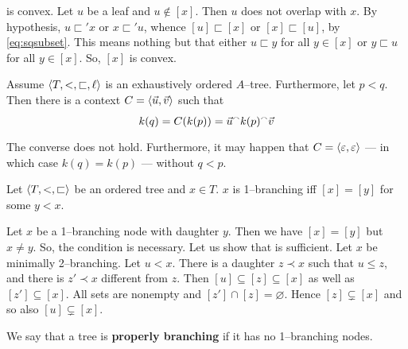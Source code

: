 is convex. Let $u$ be a leaf and $u \not\in [x]$. Then $u$ does not 
overlap with $x$.  By hypothesis, $u \sqsubset' x$ or $x \sqsubset' u$, 
whence $[u] \sqsubset [x]$ or $[x] \sqsubset [u]$, by \eqref{eq:sqsubset}. 
This means nothing but that either $u \sqsubset y$ for all 
$y \in [x]$ or $y \sqsubset u$ for all $y \in [x]$. So, $[x]$ is
convex.
\proofend
\begin{lem}
Assume $\langle T, <, \sqsubset, \ell\rangle$ is an exhaustively
ordered $A$--tree. Furthermore, let $p < q$. Then there is a
context $C = \langle \vec{u}, \vec{v}\rangle$ such that
\begin{equation}
k(q) = C(k(p)) = \vec{u} {^{\smallfrown}} k(p) {^{\smallfrown}} \vec{v} 
\end{equation}
\end{lem}
The converse does not hold. Furthermore, it may happen that
$C = \langle\varepsilon, \varepsilon\rangle$ --- in which case
$k(q) = k(p)$ --- without $q < p$.
%
%
\begin{prop}
Let $\langle T, <, \sqsubset\rangle$ be an ordered tree and $x \in T$.
$x$ is 1--branch\-ing iff $[x] = [y]$ for some $y < x$.
\end{prop}
\proofbeg
Let $x$ be a 1--branching node with daughter $y$. Then we have
$[x] = [y]$ but $x \neq y$. So, the condition is necessary. Let
us show that is sufficient. Let $x$ be minimally 2--branching. Let 
$u < x$. There is a daughter $z \prec x$ such that $u \leq z$, 
and there is $z' \prec x$ different from $z$. Then $[u] \subseteq 
[z] \subseteq [x]$ as well as $[z'] \subseteq [x]$. All sets 
are nonempty and $[z'] \cap [z] = \varnothing$. Hence 
$[z] \subsetneq [x]$ and so also $[u] \subsetneq [x]$.
\proofend

We say that a tree is \textbf{properly branching} if it has
no 1--branching nodes.

